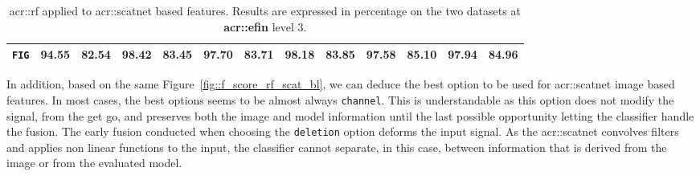 \begin{sidewaystable}[htpb]
\begin{tabular}{| c | c c | c c | c c | c c | c c | c c |}
                    \hline
                    \texttt{FIG} & 94.55 & 82.54 & 98.42 & 83.45 & 97.70 & 83.71 & 98.18 & 83.85 & 97.58 & 85.10 & \textbf{97.94} & \textbf{84.96} \\
                    \hline
                \end{tabular}
                \caption{
                    \label{tab::stats_scat_rf_f3}
                    \gls{acr::rf} applied to \gls{acr::scatnet} based features.
                    Results are expressed in percentage on the two datasets at \textbf{\gls{acr::efin}} level 3.
                }
            \end{sidewaystable}
            
            In addition, based on the same Figure~\ref{fig::f_score_rf_scat_bl}, we can deduce the best option to be used for \gls{acr::scatnet} image based features.
            In most cases, the best options seems to be almost always \texttt{channel}.
            This is understandable as this option does not modify the signal, from the get go, and preserves both the image and model information until the last possible opportunity letting the classifier handle the fusion.
            The early fusion conducted when choosing the \texttt{deletion} option deforms the input signal.
            As the \gls{acr::scatnet} convolves filters and applies non linear functions to the input, the classifier cannot separate, in this case, between information that is derived from the image or from the evaluated model.\\

